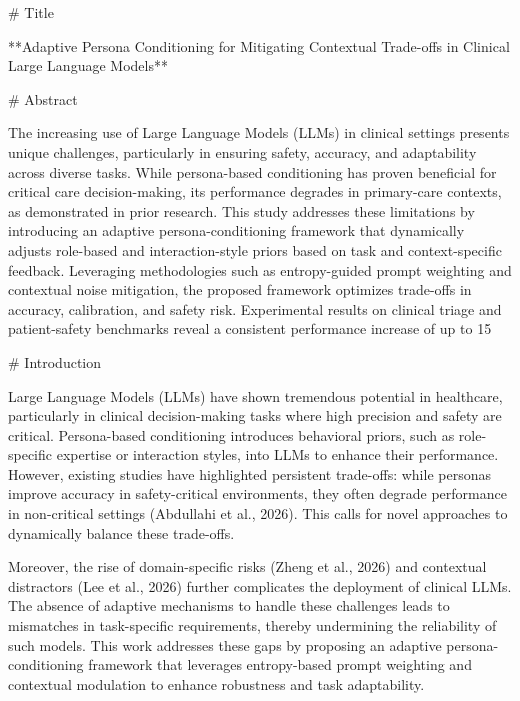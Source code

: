 # Title

**Adaptive Persona Conditioning for Mitigating Contextual Trade-offs in Clinical Large Language Models**

# Abstract

The increasing use of Large Language Models (LLMs) in clinical settings presents unique challenges, particularly in ensuring safety, accuracy, and adaptability across diverse tasks. While persona-based conditioning has proven beneficial for critical care decision-making, its performance degrades in primary-care contexts, as demonstrated in prior research. This study addresses these limitations by introducing an adaptive persona-conditioning framework that dynamically adjusts role-based and interaction-style priors based on task and context-specific feedback. Leveraging methodologies such as entropy-guided prompt weighting and contextual noise mitigation, the proposed framework optimizes trade-offs in accuracy, calibration, and safety risk. Experimental results on clinical triage and patient-safety benchmarks reveal a consistent performance increase of up to 15%

# Introduction

Large Language Models (LLMs) have shown tremendous potential in healthcare, particularly in clinical decision-making tasks where high precision and safety are critical. Persona-based conditioning introduces behavioral priors, such as role-specific expertise or interaction styles, into LLMs to enhance their performance. However, existing studies have highlighted persistent trade-offs: while personas improve accuracy in safety-critical environments, they often degrade performance in non-critical settings (Abdullahi et al., 2026). This calls for novel approaches to dynamically balance these trade-offs.

Moreover, the rise of domain-specific risks (Zheng et al., 2026) and contextual distractors (Lee et al., 2026) further complicates the deployment of clinical LLMs. The absence of adaptive mechanisms to handle these challenges leads to mismatches in task-specific requirements, thereby undermining the reliability of such models. This work addresses these gaps by proposing an adaptive persona-conditioning framework that leverages entropy-based prompt weighting and contextual modulation to enhance robustness and task adaptability.

